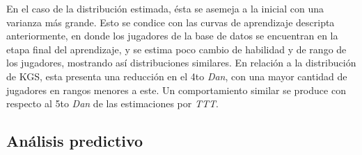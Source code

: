 \documentclass[11pt,twoside,spanish]{report} %
\begin{document}
En el caso de la distribuci\'on estimada, \'esta se asemeja a la inicial con una varianza m\'as grande.
Esto se condice con las curvas de aprendizaje descripta anteriormente, en donde los jugadores de la base de datos se encuentran en la etapa final del aprendizaje, y se estima poco cambio de habilidad y de rango de los jugadores, mostrando as\'i distribuciones similares.
En relaci\'on a la distribuci\'on de KGS, esta presenta una reducci\'on en el 4to \textit{Dan}, con una mayor cantidad de jugadores en rangos menores a este.
Un comportamiento similar se produce con respecto al 5to \textit{Dan} de las estimaciones por \textit{TTT}.



\vspace{5cm}
\subsection{An\'alisis predictivo}
\end{document}
